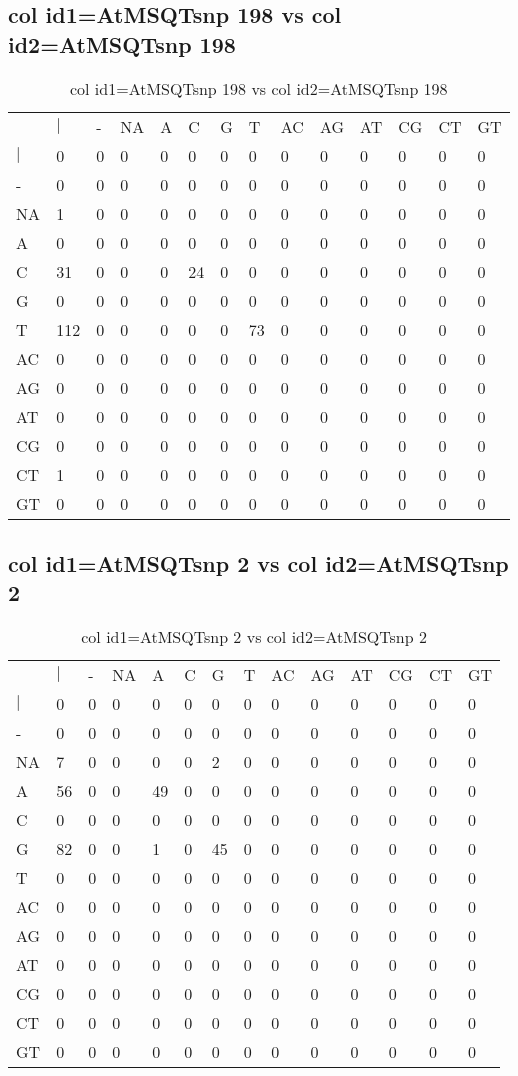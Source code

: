 \subsection{col id1=AtMSQTsnp 198 vs col id2=AtMSQTsnp 198}
\begin{center}
\begin{longtable}{|l|l|l|l|l|l|l|l|l|l|l|l|l|l|}
\caption{col id1=AtMSQTsnp 198 vs col id2=AtMSQTsnp 198} \label{table_dm568}\\
\hline
\\
\hline
&$|$&-&NA&A&C&G&T&AC&AG&AT&CG&CT&GT\\
$|$&0&0&0&0&0&0&0&0&0&0&0&0&0\\
-&0&0&0&0&0&0&0&0&0&0&0&0&0\\
NA&1&0&0&0&0&0&0&0&0&0&0&0&0\\
A&0&0&0&0&0&0&0&0&0&0&0&0&0\\
C&31&0&0&0&24&0&0&0&0&0&0&0&0\\
G&0&0&0&0&0&0&0&0&0&0&0&0&0\\
T&112&0&0&0&0&0&73&0&0&0&0&0&0\\
AC&0&0&0&0&0&0&0&0&0&0&0&0&0\\
AG&0&0&0&0&0&0&0&0&0&0&0&0&0\\
AT&0&0&0&0&0&0&0&0&0&0&0&0&0\\
CG&0&0&0&0&0&0&0&0&0&0&0&0&0\\
CT&1&0&0&0&0&0&0&0&0&0&0&0&0\\
GT&0&0&0&0&0&0&0&0&0&0&0&0&0\\
\hline
\end{longtable}
\end{center}

\subsection{col id1=AtMSQTsnp 2 vs col id2=AtMSQTsnp 2}
\begin{center}
\begin{longtable}{|l|l|l|l|l|l|l|l|l|l|l|l|l|l|}
\caption{col id1=AtMSQTsnp 2 vs col id2=AtMSQTsnp 2} \label{table_dm570}\\
\hline
\\
\hline
&$|$&-&NA&A&C&G&T&AC&AG&AT&CG&CT&GT\\
$|$&0&0&0&0&0&0&0&0&0&0&0&0&0\\
-&0&0&0&0&0&0&0&0&0&0&0&0&0\\
NA&7&0&0&0&0&2&0&0&0&0&0&0&0\\
A&56&0&0&49&0&0&0&0&0&0&0&0&0\\
C&0&0&0&0&0&0&0&0&0&0&0&0&0\\
G&82&0&0&1&0&45&0&0&0&0&0&0&0\\
T&0&0&0&0&0&0&0&0&0&0&0&0&0\\
AC&0&0&0&0&0&0&0&0&0&0&0&0&0\\
AG&0&0&0&0&0&0&0&0&0&0&0&0&0\\
AT&0&0&0&0&0&0&0&0&0&0&0&0&0\\
CG&0&0&0&0&0&0&0&0&0&0&0&0&0\\
CT&0&0&0&0&0&0&0&0&0&0&0&0&0\\
GT&0&0&0&0&0&0&0&0&0&0&0&0&0\\
\hline
\end{longtable}
\end{center}

